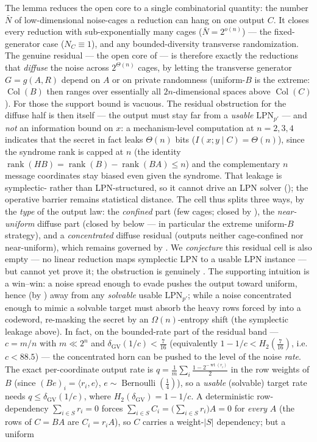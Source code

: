\documentclass[11pt,a4paper]{article}
\theoremstyle{plain}
\theoremstyle{definition}
\begin{document}
The lemma reduces the open core to a single combinatorial quantity: the number $\bar N$ of low-dimensional noise-cages a reduction can hang on one output $C$. It closes every reduction with sub-exponentially many cages ($\bar N=2^{o(n)}$) --- the fixed-generator case ($N_C\equiv 1$), and any bounded-diversity transverse randomization. The genuine residual --- the open core of  --- is therefore exactly the reductions that \emph{diffuse} the noise across $2^{\Theta(n)}$ cages, by letting the transverse generator $G=g(A,R)$ depend on $A$ or on private randomness (uniform-$B$ is the extreme: $\operatorname{Col}(B)$ then ranges over essentially all $2n$-dimensional spaces above $\operatorname{Col}(C)$). For those the support bound is vacuous. The residual obstruction for the diffuse half is then  itself --- the output must stay far from a \emph{usable} $\mathrm{LPN}_{p'}$ --- and \emph{not} an information bound on $x$: a mechanism-level computation at $n=2,3,4$ indicates that the secret in fact leaks $\Theta(n)$ bits ($I(x;y\mid C)=\Theta(n)$), since the syndrome rank is capped at $n$ (the identity $\operatorname{rank}(HB)=\operatorname{rank}(B)-\operatorname{rank}(BA)\le n$) and the complementary $n$ message coordinates stay biased even given the syndrome. That leakage is symplectic- rather than LPN-structured, so it cannot drive an LPN solver (); the operative barrier remains statistical distance. The cell thus splits three ways, by the \emph{type} of the output law: the \emph{confined} part (few cages; closed by ), the \emph{near-uniform} diffuse part (closed by  below --- in particular the extreme uniform-$B$ strategy), and a \emph{concentrated} diffuse residual (outputs neither cage-confined nor near-uniform), which remains governed by . We \emph{conjecture} this residual cell is also empty --- no linear reduction maps symplectic LPN to a usable LPN instance --- but cannot yet prove it; the obstruction is genuinely . The supporting intuition is a win--win: a noise spread enough to evade  pushes the output toward uniform, hence (by ) away from any \emph{solvable} usable $\mathrm{LPN}_{p'}$; while a noise concentrated enough to mimic a solvable target must absorb the heavy rows forced by  into a codeword, re-masking the secret by an $\Omega(n)$-entropy shift (the symplectic leakage above). In fact, on the bounded-rate part of the residual band --- $c=m/n$ with $m\ll 2^n$ and $\delta_{\mathrm{GV}}(1/c)<\tfrac{7}{16}$ (equivalently $1-1/c<H_2(\tfrac7{16})$, i.e.\ $c<88.5$) --- the concentrated horn can be pushed to the level of the noise \emph{rate}. The exact per-coordinate output rate is $q=\frac1m\sum_i\frac{1-2^{-\operatorname{wt}(r_i)}}{2}$ in the row weights of $B$ (since $(Be)_i=\langle r_i,e\rangle$, $e\sim\operatorname{Bernoulli}(\tfrac14)$), so a \emph{usable} (solvable) target rate needs $q\le\delta_{\mathrm{GV}}(1/c)$, where $H_2(\delta_{\mathrm{GV}})=1-1/c$. A deterministic row-dependency $\sum_{i\in S}r_i=0$ forces $\sum_{i\in S}C_i=\bigl(\sum_{i\in S}r_i\bigr)A=0$ for \emph{every} $A$ (the rows of $C=BA$ are $C_i=r_iA$), so $C$ carries a weight-$|S|$ dependency; but a uniform 
\end{document}
